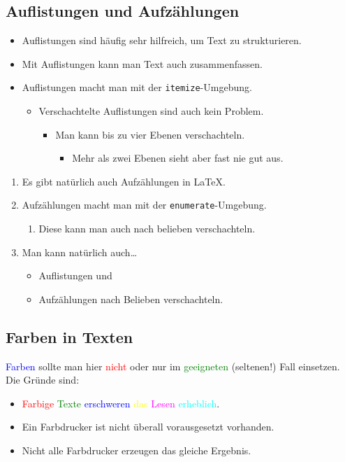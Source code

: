 \documentclass{llncs}
\begin{document}
\subsection{Auflistungen und Aufzählungen}

\begin{itemize}
\item Auflistungen sind häufig sehr hilfreich, um Text zu strukturieren. \item Mit Auflistungen kann man Text auch zusammenfassen.
\item Auflistungen macht man mit der \texttt{itemize}-Umgebung.
\begin{itemize}
\item Verschachtelte Auflistungen sind auch kein Problem.
\begin{itemize}
\item Man kann bis zu vier Ebenen verschachteln.
\begin{itemize}
\item Mehr als zwei Ebenen sieht aber fast nie gut aus.
\end{itemize}
\end{itemize}
\end{itemize}
\end{itemize}

\begin{enumerate}
\item Es gibt natürlich auch Aufzählungen in \LaTeX.
\item Aufzählungen macht man mit der \texttt{enumerate}-Umgebung.
\begin{enumerate}
\item Diese kann man auch nach belieben verschachteln.
\end{enumerate}
\item Man kann natürlich auch\dots
\begin{itemize}
\item Auflistungen und
\item Aufzählungen nach Belieben verschachteln.
\end{itemize}
\end{enumerate}

\subsection{Farben in Texten}

\textcolor{blue}{Farben} sollte man hier \textcolor{red}{nicht} oder nur im \textcolor{green}{geeigneten} (seltenen!) Fall einsetzen. Die Gründe sind:
\begin{itemize}
\item \textcolor{red}{Farbige} \textcolor{green}{Texte} \textcolor{blue}{erschweren} \textcolor{yellow}{das} \textcolor{magenta}{Lesen} \textcolor{cyan}{erheblich}.
\item Ein Farbdrucker ist nicht überall vorausgesetzt vorhanden.
\item Nicht alle Farbdrucker erzeugen das gleiche Ergebnis.
\end{itemize}
\end{document}
